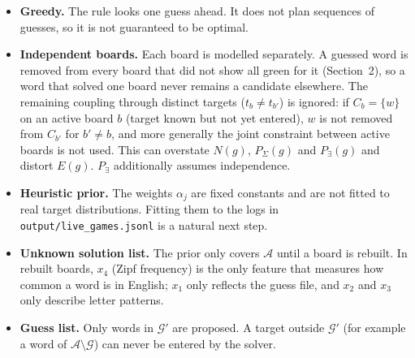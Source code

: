 \documentclass[11pt,a4paper]{article}
\theoremstyle{definition}
\theoremstyle{remark}
\newcommand{\G}{\mathcal{G}}
\newcommand{\A}{\mathcal{A}}
\begin{document}
\begin{itemize}
  \item \textbf{Greedy.} The rule looks one guess ahead. It does not plan sequences of
        guesses, so it is not guaranteed to be optimal.
  \item \textbf{Independent boards.} Each board is modelled separately. A guessed word
        is removed from every board that did not show all green for it
        (Section~2), so a word that solved one board never remains a candidate elsewhere.
        The remaining coupling through distinct targets ($t_b \neq t_{b'}$) is ignored:
        if $C_b = \{w\}$ on an active board $b$ (target known but not yet entered),
        $w$ is not removed from $C_{b'}$ for $b' \neq b$, and more generally the joint
        constraint between active boards is not used. This can overstate $N(g)$,
        $P_\Sigma(g)$ and $P_\exists(g)$ and distort $E(g)$.
        $P_\exists$ additionally assumes independence.
  \item \textbf{Heuristic prior.} The weights $\alpha_j$ are fixed constants and are not
        fitted to real target distributions. Fitting them to the logs in
        \texttt{output/live\_games.jsonl} is a natural next step.
  \item \textbf{Unknown solution list.} The prior only covers $\A$ until a board is rebuilt.
        In rebuilt boards, $x_4$ (Zipf frequency) is the only feature that measures how
        common a word is in English; $x_1$ only reflects the guess file, and
        $x_2$ and $x_3$ only describe letter patterns.
  \item \textbf{Guess list.} Only words in $\G'$ are proposed. A target outside $\G'$
        (for example a word of $\A \setminus \G$) can never be entered by the solver.
\end{itemize}
\end{document}
